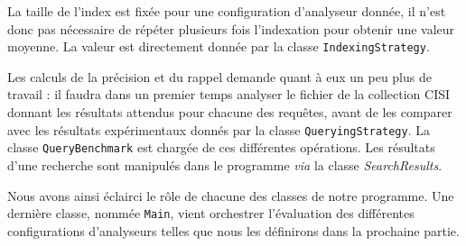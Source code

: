La taille de l’index est fixée pour une configuration d’analyseur donnée, il n’est donc pas nécessaire de répéter plusieurs fois l’indexation pour obtenir une valeur moyenne. La valeur est directement donnée par la classe \texttt{IndexingStrategy}.

Les calculs de la précision et du rappel demande quant à eux un peu plus de travail : il faudra dans un premier temps analyser le fichier de la collection CISI donnant les résultats attendus pour chacune des requêtes, avant de les comparer avec les résultats expérimentaux donnés par la classe \texttt{QueryingStrategy}. La classe \texttt{QueryBenchmark} est chargée de ces différentes opérations. Les résultats d’une recherche sont manipulés dans le programme \textit{via} la classe \textit{SearchResults}.

Nous avons ainsi éclairci le rôle de chacune des classes de notre programme. Une dernière classe, nommée \texttt{Main}, vient orchestrer l’évaluation des différentes configurations d’analyseurs telles que nous les définirons dans la prochaine partie.

